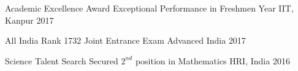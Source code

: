 \begin{cvhonors}

  \cvhonor
  {Academic Excellence Award}
  {Exceptional Performance in Freshmen Year}
  {IIT, Kanpur}
  {2017}

  \cvhonor
  {All India Rank 1732}
  {Joint Entrance Exam Advanced}
  {India}
  {2017}
  
  \cvhonor
  {Science Talent Search}
  {Secured $2^{nd}$ position in Mathematics}
  {HRI, India}
  {2016}

\end{cvhonors}

